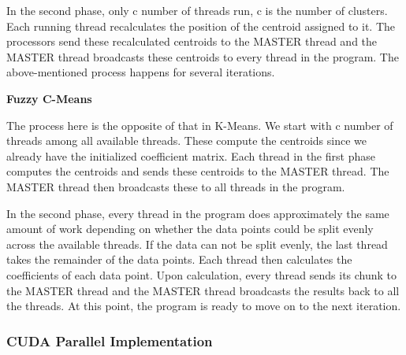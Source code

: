 \begin{multicols*}{2}
    In the second phase, only c number of threads run, c is the number of clusters. Each running thread recalculates the position of the centroid assigned to it. The processors send these recalculated centroids to the MASTER thread and the MASTER thread broadcasts these centroids to every thread in the program. The above-mentioned process happens for several iterations. 
    
    \textbf{Fuzzy C-Means}

    The process here is the opposite of that in K-Means. We start with c number of threads among all available threads. These compute the centroids since we already have the initialized coefficient matrix. Each thread in the first phase computes the centroids and sends these centroids to the MASTER thread. The MASTER thread then broadcasts these to all threads in the program. 

    In the second phase, every thread in the program does approximately the same amount of work depending on whether the data points could be split evenly across the available threads. If the data can not be split evenly, the last thread takes the remainder of the data points.  Each thread then calculates the coefficients of each data point. Upon calculation, every thread sends its chunk to the MASTER thread and the MASTER thread broadcasts the results back to all the threads. At this point, the program is ready to move on to the next iteration.

    \subsubsection{CUDA Parallel Implementation}










\end{multicols*}


